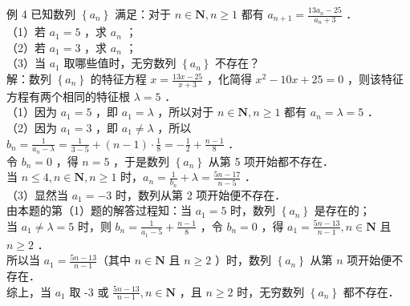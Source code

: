 \documentclass[10pt]{article}
\begin{document}
例 4 已知数列 \(\left\{a_{n}\right\}\) 满足：对于 \(n \in \mathbf{N}, n \geqslant 1\) 都有 \(a_{n+1}=\frac{13 a_{n}-25}{a_{n}+3}\) ．\\
（1）若 \(a_{1}=5\) ，求 \(a_{n}\) ；\\
（2）若 \(a_{1}=3\) ，求 \(a_{n}\) ；\\
（3）当 \(a_{1}\) 取哪些值时，无穷数列 \(\left\{a_{n}\right\}\) 不存在？\\
解：数列 \(\left\{a_{n}\right\}\) 的特征方程 \(x=\frac{13 x-25}{x+3}\) ，化简得 \(x^{2}-10 x+25=0\) ，则该特征方程有两个相同的特征根 \(\lambda=5\) ．\\
（1）因为 \(a_{1}=5\) ，即 \(a_{1}=\lambda\) ，所以对于 \(n \in \mathbf{N}, n \geqslant 1\) 都有 \(a_{n}=\lambda=5\) ．\\
（2）因为 \(a_{1}=3\) ，即 \(a_{1} \neq \lambda\) ，所以 \(b_{n}=\frac{1}{a_{n}-\lambda}=\frac{1}{3-5}+(n-1) \cdot \frac{1}{8}=-\frac{1}{2}+\frac{n-1}{8}\) ．\\
令 \(b_{n}=0\) ，得 \(n=5\) ，于是数列 \(\left\{a_{n}\right\}\) 从第 5 项开始都不存在．\\
当 \(n \leqslant 4, n \in \mathbf{N}, n \geqslant 1\) 时，\(a_{n}=\frac{1}{b_{n}}+\lambda=\frac{5 n-17}{n-5}\) ．\\
（3）显然当 \(a_{1}=-3\) 时，数列从第 2 项开始便不存在．\\
由本题的第（1）题的解答过程知：当 \(a_{1}=5\) 时，数列 \(\left\{a_{n}\right\}\) 是存在的；\\
当 \(a_{1} \neq \lambda=5\) 时，则 \(b_{n}=\frac{1}{a_{1}-5}+\frac{n-1}{8}\) ，令 \(b_{n}=0\) ，得 \(a_{1}=\frac{5 n-13}{n-1}, n \in \mathbf{N}\) 且 \(n \geqslant 2\) ．\\
所以当 \(a_{1}=\frac{5 n-13}{n-1}\)（其中 \(n \in \mathbf{N}\) 且 \(n \geqslant 2\) ）时，数列 \(\left\{a_{n}\right\}\) 从第 \(n\) 项开始便不存在．\\
综上，当 \(a_{1}\) 取 -3 或 \(\frac{5 n-13}{n-1}, n \in \mathbf{N}\) ，且 \(n \geqslant 2\) 时，无穷数列 \(\left\{a_{n}\right\}\) 都不存在．
\end{document}

